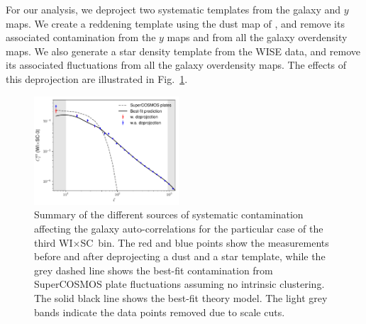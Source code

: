 \documentclass[useAMS,usenatbib]{mn2e}
\newcommand{\wisc}{WI$\times$SC}
\begin{document}
      For our analysis, we deproject two systematic templates from the galaxy and $y$ maps. We create a reddening template using the dust map of \cite{1998ApJ...500..525S}, and remove its associated contamination from the $y$ maps and from all the galaxy overdensity maps. We also generate a star density template from the WISE data, and remove its associated fluctuations from all the galaxy overdensity maps. The effects of this deprojection are illustrated in Fig.\!~\ref{fig:clsyst}.

      \begin{figure}
        \centering
        \includegraphics[width=0.48\textwidth]{cl_syst_summary.pdf}
        \caption{Summary of the different sources of systematic contamination affecting the galaxy auto-correlations for the particular case of the third \wisc~bin. The red and blue points show the measurements before and after deprojecting a dust and a star template, while the grey dashed line shows the best-fit contamination from SuperCOSMOS plate fluctuations assuming no intrinsic clustering. The solid black line shows the best-fit theory model. The light grey bands indicate the data points removed due to scale cuts.}
        \label{fig:clsyst}
      \end{figure}
\end{document}
